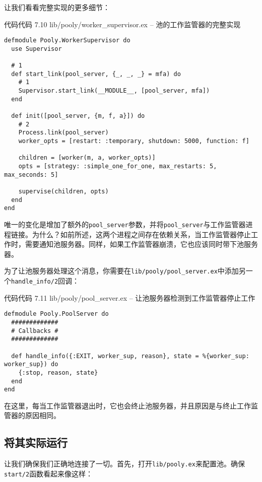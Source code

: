 让我们看看完整实现的更多细节：

代码代码 7.10 lib/pooly/worker\_supervisor.ex --
池的工作监管器的完整实现

\begin{code}{}
\begin{verbatim}
defmodule Pooly.WorkerSupervisor do
  use Supervisor

  # 1
  def start_link(pool_server, {_, _, _} = mfa) do
    # 1
    Supervisor.start_link(__MODULE__, [pool_server, mfa])
  end

  def init([pool_server, {m, f, a}]) do
    # 2
    Process.link(pool_server)
    worker_opts = [restart: :temporary, shutdown: 5000, function: f]

    children = [worker(m, a, worker_opts)]
    opts = [strategy: :simple_one_for_one, max_restarts: 5, max_seconds: 5]

    supervise(children, opts)
  end
end
\end{verbatim}
\end{code}

唯一的变化是增加了额外的\texttt{pool\_server}参数，并将\texttt{pool\_server}与工作监管器进程链接。为什么？如前所述，这两个进程之间存在依赖关系，当工作监管器停止工作时，需要通知池服务器。同样，如果工作监管器崩溃，它也应该同时带下池服务器。

为了让池服务器处理这个消息，你需要在\texttt{lib/pooly/pool\_server.ex}中添加另一个\texttt{handle\_info/2}回调：

代码代码 7.11 lib/pooly/pool\_server.ex --
让池服务器检测到工作监管器停止工作

\begin{code}{}
\begin{verbatim}
defmodule Pooly.PoolServer do
  #############
  # Callbacks #
  #############

  def handle_info({:EXIT, worker_sup, reason}, state = %{worker_sup: worker_sup}) do
    {:stop, reason, state}
  end
end
\end{verbatim}
\end{code}

在这里，每当工作监管器退出时，它也会终止池服务器，并且原因是与终止工作监管器的原因相同。

\subsection{将其实际运行}

让我们确保我们正确地连接了一切。首先，打开\texttt{lib/pooly.ex}来配置池。确保\texttt{start/2}函数看起来像这样：

